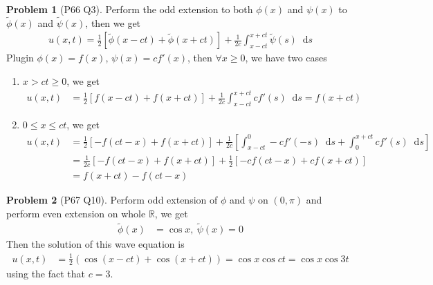 \documentclass[twoside,11pt]{article}
\newcommand{\R}{\mathbb{R}}
\renewcommand*\d{\mathop{}\!\mathrm{d}}
\theoremstyle{definition}
\newtheorem{problem}{Problem}
\theoremstyle{remark}
\begin{document}
\begin{problem}[P66 Q3]
Perform the odd extension to both
$\phi(x)$ and $\psi(x)$ to $\tilde{\phi}(x)$
and $\tilde{\psi}(x)$, then we get
\begin{align*}
    u(x,t) = \frac{1}{2}[
        \tilde{\phi}(x-ct)
        + \tilde{\phi}(x+ct)
    ] + \frac{1}{2c}
    \int_{x-ct}^{x+ct}\tilde{\psi}(s)\d s
\end{align*}
Plugin $\phi(x)=f(x)$, $\psi(x)=cf'(x)$,
then $\forall x\geq 0$, we have two cases
\begin{enumerate}
    \item $x> ct\geq 0$, we get
    \begin{align*}
        u(x,t) &= \frac{1}{2}[
            f(x-ct) + f(x+ct)
        ] + \frac{1}{2c}
        \int_{x-ct}^{x+ct}cf'(s)\d s = 
        f(x+ct)
    \end{align*}

    \item $0\leq x\leq ct$, we get
    \begin{align*}
        u(x,t) 
        &= \frac{1}{2}[
            -f(ct-x) + f(x+ct)
        ] + \frac{1}{2c}\left[
            \int_{x-ct}^0-cf'(-s)\d s
            + \int_0^{x+ct}cf'(s)\d s
        \right]\\
        &= \frac{1}{2c}[
            -f(ct-x) + f(x+ct)
        ] + \frac{1}{2}\left[
            -cf(ct-x) + cf(x+ct)
        \right]\\
        &= f(x+ct) - f(ct-x)
    \end{align*}
\end{enumerate}
\end{problem}


\begin{problem}[P67 Q10]
Perform odd extension of $\phi$ and $\psi$ on $(0, \pi)$
and perform even extension on whole $\R$, we get
\begin{align*}
    \tilde{\phi}(x) &= \cos x,\ \tilde{\psi}(x) = 0
\end{align*}
Then the solution of this wave equation is
\begin{align*}
    u(x,t) &=
    \frac{1}{2}(\cos (x-ct) + \cos (x+ct)) 
    = \cos x\cos ct = \cos x\cos 3t
\end{align*}
using the fact that $c=3$.
\end{problem}
\end{document}
